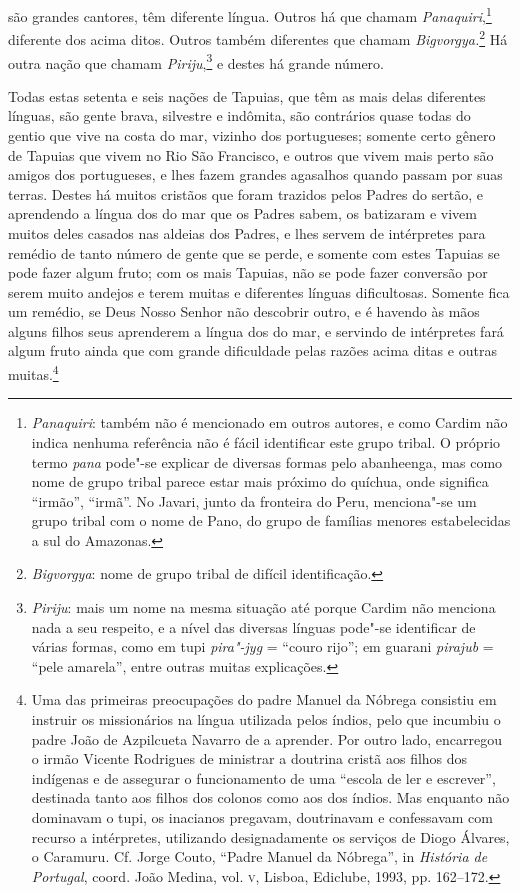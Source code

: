 são grandes cantores, têm diferente língua. Outros há que chamam
\textit{Panaquiri},\footnote{ \textit{Panaquiri}: também não é
mencionado em outros autores, e como Cardim não indica nenhuma
referência não é fácil identificar este grupo tribal. O próprio termo
\textit{pana} pode"-se explicar de diversas formas pelo abanheenga,
mas como nome de grupo tribal parece estar mais próximo do quíchua,
onde significa ``irmão'', ``irmã''. No Javari, junto da fronteira do Peru,
menciona"-se um grupo tribal com o nome de Pano, do grupo de famílias
menores estabelecidas a sul do Amazonas.} diferente dos acima ditos.
Outros também diferentes que chamam 
\textit{Bigvorgya.}\footnote{ \textit{Bigvorgya}: nome de grupo tribal de difícil
identificação.} Há outra nação que chamam 
\textit{Piriju},\footnote{ \textit{Piriju}: mais um nome na mesma situação até porque
Cardim não menciona nada a seu respeito, e a nível das diversas línguas
pode"-se identificar de várias formas, como em tupi \textit{pira"-jyg} = 
``couro rijo''; em guarani \textit{pirajub} = ``pele amarela'', entre
outras muitas explicações.} e destes há grande número. 

 Todas estas setenta e seis nações de Tapuias, que têm as mais delas
diferentes línguas, são gente brava, silvestre e indômita, são
contrários quase todas do gentio que vive na costa do mar, vizinho dos
portugueses; somente certo gênero de Tapuias que vivem no Rio São
Francisco, e outros que vivem mais perto são amigos dos portugueses, e
lhes fazem grandes agasalhos quando passam por suas terras. Destes há
muitos cristãos que foram trazidos pelos Padres do sertão, e aprendendo
a língua dos do mar que os Padres sabem, os batizaram e vivem muitos
deles casados nas aldeias dos Padres, e lhes servem de intérpretes para
remédio de tanto número de gente que se perde, e somente com estes
Tapuias se pode fazer algum fruto; com os mais Tapuias, não se pode
fazer conversão por serem muito andejos e terem muitas e diferentes
línguas dificultosas. Somente fica um remédio, se Deus Nosso Senhor não
descobrir outro, e é havendo às mãos alguns filhos seus aprenderem a
língua dos do mar, e servindo de intérpretes fará algum fruto ainda que
com grande dificuldade pelas razões acima ditas e outras 
muitas.\footnote{ Uma das primeiras preocupações do padre Manuel da
Nóbrega consistiu em instruir os missionários na língua utilizada pelos
índios, pelo que incumbiu o padre João de Azpilcueta Navarro de a
aprender. Por outro lado, encarregou o irmão Vicente Rodrigues de
ministrar a doutrina cristã aos filhos dos indígenas e de assegurar o
funcionamento de uma ``escola de ler e escrever'', destinada tanto aos
filhos dos colonos como aos dos índios. Mas enquanto não dominavam o
tupi, os inacianos pregavam, doutrinavam e confessavam com recurso a
intérpretes, utilizando designadamente os serviços de Diogo Álvares, o
Caramuru. Cf. Jorge Couto, ``Padre Manuel da Nóbrega'', in
\textit{História de Portugal}, coord. João Medina, vol. \textsc{v}, Lisboa,
Ediclube, 1993, pp. 162--172.} 


